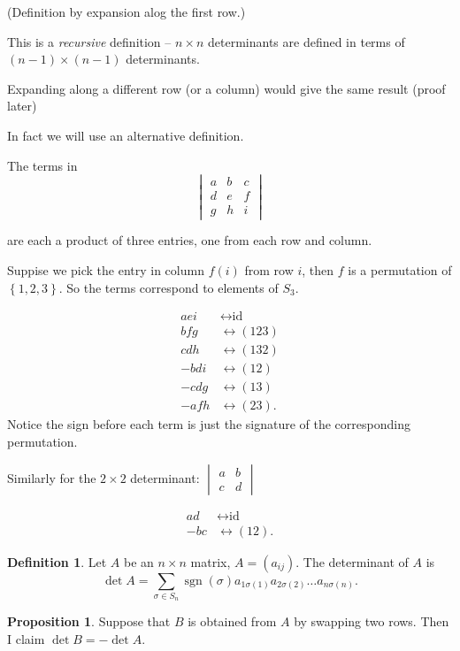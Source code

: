\documentclass{article}
\theoremstyle{definition} \newtheorem*{definition}{Definition}
\newtheorem{proposition}[theorem]{Proposition}
\DeclareMathOperator{\sgn}{sgn} \DeclareMathOperator{\id}{id}
\begin{document}
(Definition by expansion alog the first row.)

This is a \emph{recursive} definition -- $n \times n$ determinants are defined
in terms of $(n-1) \times (n-1)$ determinants.

Expanding along a different row (or a column) would give the same result (proof
later)


In fact we will use an alternative definition.

The terms in \[ \begin{vmatrix} a & b & c \\ d & e & f \\ g & h & i
\end{vmatrix} \]

are each a product of three entries, one from each row and column.

Suppise we pick the entry in column $f(i)$ from row $i$, then $f$ is a
permutation of $\left\{ 1,2,3 \right\}$. So the terms correspond to elements of
$S_3$.

\begin{align*} aei &\leftrightarrow \text{id} \\ bfg &\leftrightarrow (123) \\
  cdh &\leftrightarrow (132) \\ -bdi &\leftrightarrow (12) \\ -cdg
  &\leftrightarrow (13) \\ -afh &\leftrightarrow (23).  \end{align*} Notice the
sign before each term is just the signature of the corresponding permutation.

Similarly for the $2 \times 2$ determinant: $\begin{vmatrix}a & b \\ c &
  d\end{vmatrix}$

\begin{align*} ad &\leftrightarrow \text{id} \\ -bc &\leftrightarrow (12).
\end{align*}

\begin{definition} Let $A$ be an $n \times n$ matrix, $A = (a_{ij})$. The
  determinant of $A$ is \[ \det A = \sum_{\sigma \in S_n} \sgn(\sigma)
  a_{1\sigma(1)}a_{2\sigma (2)}\dots a_{n \sigma (n)}.  \] \end{definition}

\begin{proposition} \label{prp:swaprows} Suppose that $B$ is obtained from $A$
  by swapping two rows. Then I claim $\det B = -\det A$.  \end{proposition}
\end{document}
